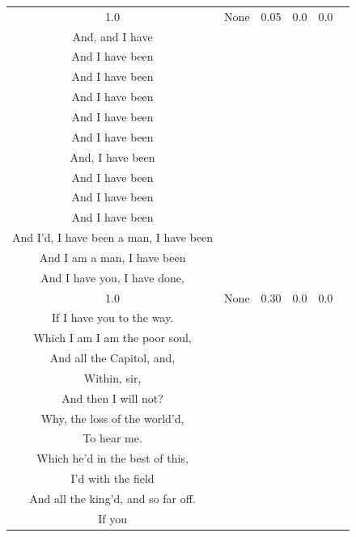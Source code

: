 \documentclass[11pt]{book}
\begin{document}
\begin{longtable}{ccccc >{\raggedright\arraybackslash}p{8cm}}
    1.0 & None & 0.05 & 0.0 & 0.0 &
    \begin{tcolorbox}[breakable, enhanced jigsaw, frame hidden, colback=white, boxrule=0pt]
    KING RICHARD:\\
    And, and I have\\
    And I have been\\
    And I have been\\
    And I have been\\
    And I have been\\
    And I have been\\
    And, I have been\\
    And I have been\\
    And I have been\\
    And I have been\\
    And I'd, I have been a man, I have been\\
    And I am a man, I have been\\
    And I have you, I have done,
    \end{tcolorbox} \\
    
    1.0 & None & 0.30 & 0.0 & 0.0 &
    \begin{tcolorbox}[breakable, enhanced jigsaw, frame hidden, colback=white, boxrule=0pt]
    KING RICHARD:\\
    If I have you to the way.\\
    Which I am I am the poor soul,\\
    And all the Capitol, and,\\
    Within, sir,\\
    And then I will not?\\
    Why, the loss of the world'd,\\
    To hear me.\\
    Which he'd in the best of this,\\
    I'd with the field\\
    And all the king'd, and so far off.\\
    If you
    \end{tcolorbox} \\
    

\end{longtable}
\end{document}
